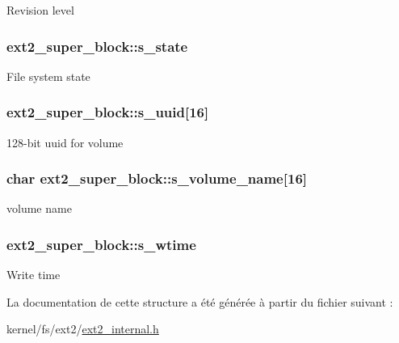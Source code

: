 \-Revision level \hypertarget{structext2__super__block_a06b739ed98ef97510f193cb582e78eb6}{
\subsubsection[{s\-\_\-state}]{ {\bf ext2\-\_\-super\-\_\-block\-::s\-\_\-state}}}\label{structext2__super__block_a06b739ed98ef97510f193cb582e78eb6}
\-File system state \hypertarget{structext2__super__block_a1a546d295c2dc760ece8bf44c7623eb3}{
\subsubsection[{s\-\_\-uuid}]{ {\bf ext2\-\_\-super\-\_\-block\-::s\-\_\-uuid}\mbox{[}16\mbox{]}}}\label{structext2__super__block_a1a546d295c2dc760ece8bf44c7623eb3}
128-\/bit uuid for volume \hypertarget{structext2__super__block_aafa5ddd1cf9fbf19aa2b80e83bff5a43}{
\subsubsection[{s\-\_\-volume\-\_\-name}]{\setlength{\rightskip}{0pt plus 5cm}char {\bf ext2\-\_\-super\-\_\-block\-::s\-\_\-volume\-\_\-name}\mbox{[}16\mbox{]}}}\label{structext2__super__block_aafa5ddd1cf9fbf19aa2b80e83bff5a43}
volume name \hypertarget{structext2__super__block_a97c255a8e87dbea1ab953b0a8fce054d}{
\subsubsection[{s\-\_\-wtime}]{ {\bf ext2\-\_\-super\-\_\-block\-::s\-\_\-wtime}}}\label{structext2__super__block_a97c255a8e87dbea1ab953b0a8fce054d}
\-Write time 

\-La documentation de cette structure a été générée à partir du fichier suivant \-:\begin{DoxyCompactItemize}
\item 
kernel/fs/ext2/\hyperlink{ext2__internal_8h}{ext2\-\_\-internal.\-h}\end{DoxyCompactItemize}
